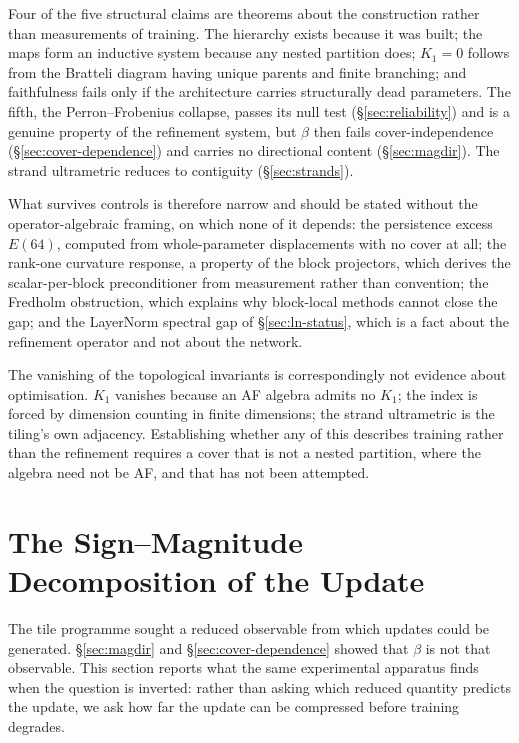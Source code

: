 Four of the five structural claims are theorems about the construction rather
than measurements of training. The hierarchy exists because it was built; the
maps form an inductive system because any nested partition does; $K_1=0$
follows from the Bratteli diagram having unique parents and finite branching;
and faithfulness fails only if the architecture carries structurally dead
parameters. The fifth, the Perron--Frobenius collapse, passes its null test
(\S\ref{sec:reliability}) and is a genuine property of the refinement system,
but $\beta$ then fails cover-independence (\S\ref{sec:cover-dependence}) and
carries no directional content (\S\ref{sec:magdir}). The strand ultrametric
reduces to contiguity (\S\ref{sec:strands}).

What survives controls is therefore narrow and should be stated without the
operator-algebraic framing, on which none of it depends: the persistence excess
$E(64)$, computed from whole-parameter displacements with no cover at all; the
rank-one curvature response, a property of the block projectors, which derives
the scalar-per-block preconditioner from measurement rather than convention;
the Fredholm obstruction, which explains why block-local methods cannot close
the gap; and the LayerNorm spectral gap of \S\ref{sec:ln-status}, which is a
fact about the refinement operator and not about the network.

The vanishing of the topological invariants is correspondingly not evidence
about optimisation. $K_1$ vanishes because an AF algebra admits no $K_1$; the
index is forced by dimension counting in finite dimensions; the strand
ultrametric is the tiling's own adjacency. Establishing whether any of this
describes training rather than the refinement requires a cover that is not a
nested partition, where the algebra need not be AF, and that has not been
attempted.

\section{The Sign--Magnitude Decomposition of the Update}
\label{sec:sign-magnitude}

The tile programme sought a reduced observable from which updates could be
generated. \S\ref{sec:magdir} and \S\ref{sec:cover-dependence} showed that
$\beta$ is not that observable. This section reports what the same experimental
apparatus finds when the question is inverted: rather than asking which reduced
quantity predicts the update, we ask how far the update can be compressed
before training degrades.

